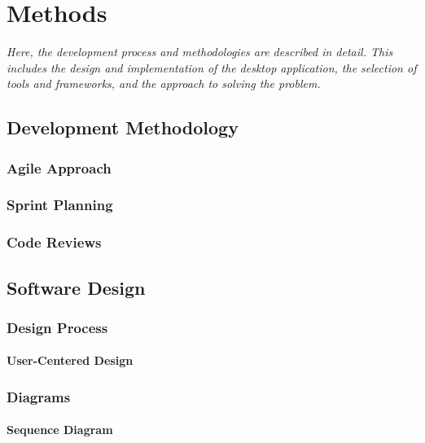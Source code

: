 \chapter{Methods}

\begin{center}
    \textit{Here, the development process and methodologies are described in detail. This includes the design and implementation of the desktop application, the selection of tools and frameworks, and the approach to solving the problem.}
\end{center}

\section{Development Methodology}
\label{sec:development-methodology}

\subsection{Agile Approach}

\subsection{Sprint Planning}

\subsection{Code Reviews}

\section{Software Design}
\label{sec:software-design}

\subsection{Design Process}

\subsubsection*{User-Centered Design}

\subsection{Diagrams}

\subsubsection*{Sequence Diagram}

